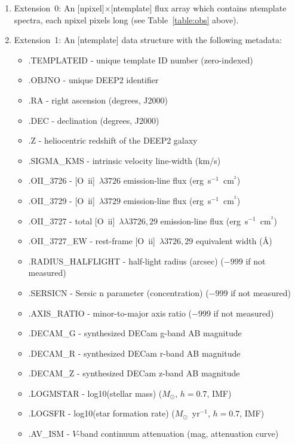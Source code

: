 \documentclass[11pt]{article}
\newcommand{\oii}{[O~{\sc ii}]}
\newcommand{\oiilam}{[O~{\sc ii}]~\ensuremath{\lambda\lambda3726,29}}
\begin{document}
\begin{enumerate}
\item{Extension~0: An [{\sc npixel}]$\times$[{\sc ntemplate}] flux
  array which contains {\sc ntemplate} spectra, each {\sc npixel}
  pixels long (see Table~\ref{table:obs} above).}
\item{Extension~1: An [{\sc ntemplate}] data structure with the
  following metadata:
\begin{itemize}
\item{.{\sc TEMPLATEID} - unique template ID number (zero-indexed)}
\item{.{\sc OBJNO} - unique DEEP2 identifier}
\item{.{\sc RA} - right ascension (degrees, J2000)}
\item{.{\sc DEC} - declination (degrees, J2000)}
\item{.{\sc Z} - heliocentric redshift of the DEEP2 galaxy} 
\item{.{\sc SIGMA\_KMS} - intrinsic velocity line-width (km/s)} 
\item{.{\sc OII\_3726} - \oii~$\lambda3726$ emission-line flux
  (erg~s$^{-1}$~cm$^{^2}$)}  
\item{.{\sc OII\_3729} - \oii~$\lambda3729$ emission-line flux
  (erg~s$^{-1}$~cm$^{^2}$)} 
\item{.{\sc OII\_3727} - total \oiilam{} emission-line flux
  (erg~s$^{-1}$~cm$^{^2}$)} 
\item{.{\sc OII\_3727\_EW} - rest-frame \oii~$\lambda3726,29$
  equivalent width (\AA)}
\item{.{\sc RADIUS\_HALFLIGHT} - half-light radius (arcsec) ($-999$ if not measured)}
\item{.{\sc SERSICN} - Sersic n parameter (concentration) ($-999$ if not measured)}
\item{.{\sc AXIS\_RATIO} - minor-to-major axis ratio ($-999$ if not measured)}
\item{.{\sc DECAM\_G} - synthesized DECam g-band AB magnitude}
\item{.{\sc DECAM\_R} - synthesized DECam r-band AB magnitude}
\item{.{\sc DECAM\_Z} - synthesized DECam z-band AB magnitude}
\item{.{\sc LOGMSTAR} - log10(stellar mass) ($M_{\odot}$, $h=0.7$,
  \citealt{chabrier03a} IMF)} 
\item{.{\sc LOGSFR} - log10(star formation rate)
  ($M_{\odot}$~yr$^{-1}$, $h=0.7$, \citealt{chabrier03a} IMF)}
\item{.{\sc AV\_ISM} - $V$-band continuum attenuation (mag,
  \citealt{charlot00a} attenuation curve)} 
\end{itemize}
}
\end{enumerate}
\end{document}

